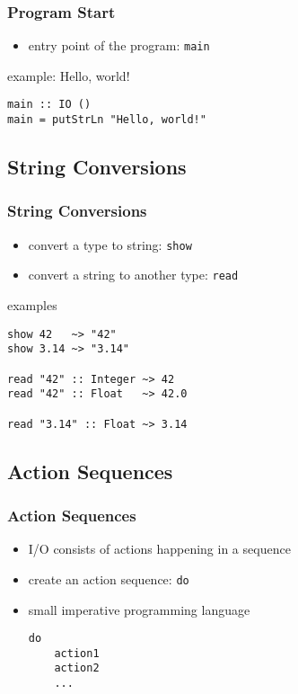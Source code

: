 \documentclass[dvipsnames]{beamer}
\theoremstyle{plain}
\begin{document}
\begin{frame}[fragile]
  \frametitle{Program Start}

  \begin{itemize}
    \item entry point of the program: \lstinline|main|
  \end{itemize}

  \medskip
  \begin{exampleblock}{example: Hello, world!}
    \begin{lstlisting}
main :: IO ()
main = putStrLn "Hello, world!"
    \end{lstlisting}
  \end{exampleblock}
\end{frame}

\subsection{String Conversions}

\begin{frame}[fragile]
  \frametitle{String Conversions}

  \begin{itemize}
    \item convert a type to string: \lstinline|show|
    \item convert a string to another type: \lstinline|read|
  \end{itemize}

  \begin{exampleblock}{examples}
    \begin{lstlisting}
show 42   ~> "42"
show 3.14 ~> "3.14"

read "42" :: Integer ~> 42
read "42" :: Float   ~> 42.0

read "3.14" :: Float ~> 3.14
    \end{lstlisting}
  \end{exampleblock}
\end{frame}

\subsection{Action Sequences}

\begin{frame}[fragile]
  \frametitle{Action Sequences}

  \begin{itemize}
    \item I/O consists of \alert{actions} happening in a sequence
    \item create an action sequence: \lstinline|do|
    \item small imperative programming language

    \medskip
    \begin{lstlisting}
do
    action1
    action2
    ...
    \end{lstlisting}
  \end{itemize}
\end{frame}
\end{document}
